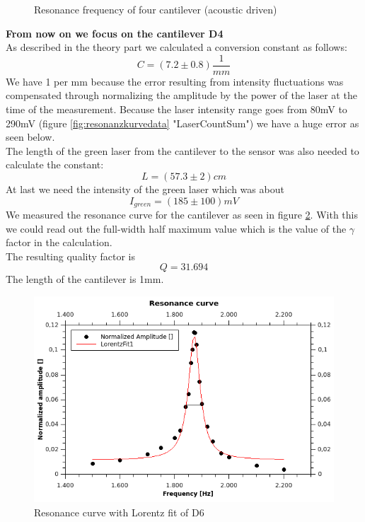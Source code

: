 \documentclass[12pt,a4paper]{article}
\begin{document}
\begin{multicols}{2}
\begin{figure}[H]
 \centering
 \caption{Resonance frequency of four cantilever (acoustic driven)}
 \label{tab:acoustic_resonance}
\end{figure}

\noindent
\textbf{From now on we focus on the cantilever D4}\\
As described in the theory part we calculated a conversion constant as follows:
$$C = (7.2 \pm 0.8) \frac{1}{mm}$$
We have 1 per mm because the error resulting from intensity fluctuations was compensated through normalizing the amplitude by the power of the laser at the time of the measurement. Because the laser intensity range goes from 80mV to 290mV (figure \ref{fig:resonanzkurvedata} "LaserCountSum") we have a huge error as seen below.\\
The length of the green laser from the cantilever to the sensor was also needed to calculate the constant:
$$L = (57.3 \pm 2)cm$$
At last we need the intensity of the green laser which was about 
$$I_{green} = (185 \pm 100)mV$$
We measured the resonance curve for the cantilever as seen in figure \ref{fig:resonanzkurve}.
With this we could read out the full-width half maximum value which is the value of the $\gamma$ factor in the calculation.\\
The resulting quality factor is
$$Q = 31.694$$
The length of the cantilever is 1mm.

\begin{figure}[H]
	\centering
	\includegraphics[scale=0.4]{../figures/Resonanzkurve.png}
	\caption{Resonance curve with Lorentz fit of D6}
	\label{fig:resonanzkurve}
\end{figure}


\end{multicols}
\end{document}
